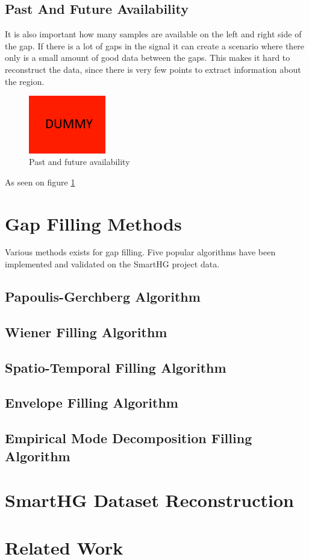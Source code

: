 \subsection{Past And Future Availability}
It is also important how many samples are available on the left and right side of the gap. If there is a lot of gaps in the signal it can create a scenario where there only is a small amount of good data between the gaps. This makes it hard to reconstruct the data, since there is very few points to extract information about the region. 
\begin{figure}[H]
\centering
\includegraphics[width=0.3\textwidth]{billeder/DUMMY.png}
\caption{Past and future availability}
\label{fig:PAF}
\end{figure}
As seen on figure \ref{fig:PAF} 

\section{Gap Filling Methods}
Various methods exists for gap filling. Five popular algorithms have been implemented and validated on the SmartHG project data.

\subsection{Papoulis-Gerchberg Algorithm}
\lipsum[7] %
\subsection{Wiener Filling Algorithm}
\lipsum[7] %
\subsection{Spatio-Temporal Filling Algorithm}
\lipsum[7] %
\subsection{Envelope Filling Algorithm}
\lipsum[7] %
\subsection{Empirical Mode Decomposition Filling Algorithm}
\lipsum[7] %

\section{SmartHG Dataset Reconstruction}

\section{Related Work}